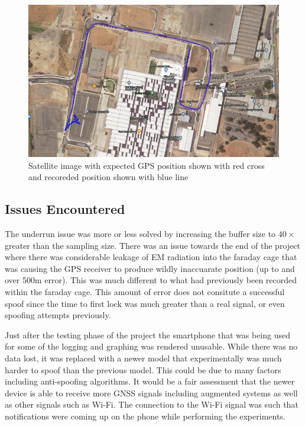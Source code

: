\begin{figure}[h]
    \begin{centering}
        \includegraphics[width=14cm,keepaspectratio]{Figures/2021_3_30_dynamic_MAB_Satellite.PNG}
        \caption{Satellite image with expected GPS position shown with red cross and recoreded position shown with blue line}
        \label{fig:MABdynamicSatelliteImage}
    \end{centering}
\end{figure}

\subsection{Issues Encountered}
The underrun issue was more or less solved by increasing the buffer size to $40\times$ greater than the sampling size.
There was an issue towards the end of the project where there was considerable leakage of EM radiation into the faraday cage that was causing the GPS receiver to produce
wildly inaccuarate position (up to and over 500m error). This was much different to what had previously been recorded within the faraday cage. This amount of error does
not consitute a successful spoof since the time to first lock was much greater than a real signal, or even spoofing attempts previously. 

Just after the testing phase of the project the smartphone that was being used for some of the logging and graphing was rendered unusable. While there was no data lost,
it was replaced with a newer model that experimentally was much harder to spoof than the previous model. This could be due to many factors including anti-spoofing
algorithms. It would be a fair assessment that the newer device is able to receive more GNSS signals including augmented systems as well as other signals such as Wi-Fi.
The connection to the Wi-Fi signal was such that notifications were coming up on the phone while performing the experiments.

